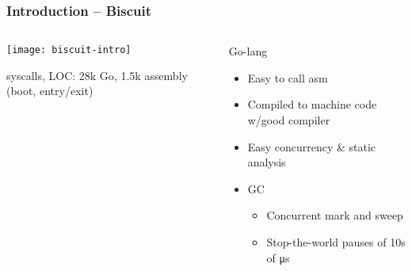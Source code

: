 \begin{frame}[plain]
	\frametitle{Introduction -- Biscuit}

	\begin{columns}
	
	\begin{column}{.4\textwidth}
		
		\texttt{[image: biscuit-intro]}
		
		 syscalls, LOC: 28k Go,
		1.5k assembly (boot, entry/exit)
		
	\end{column}
	
	\begin{column}{.6\textwidth}
	Go-lang
	\begin{itemize}
		\item Easy to call asm
		\item Compiled to machine code w/good compiler
		\item  Easy concurrency \& static analysis
		\item GC
		\begin{itemize}
		  \item Concurrent mark and sweep
		  \item Stop-the-world pauses of 10s of μs
		\end{itemize} 
	\end{itemize}
\end{column}
\end{columns}	
\end{frame}


